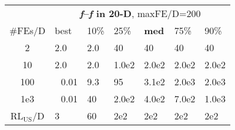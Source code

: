 \begin{tabular}{c|llllll}
 & \multicolumn{6}{|c}{\textbf{\textit{f}\raisebox{-0.35ex}{1}--\textit{f}\raisebox{-0.35ex}{24} in 20-D}, maxFE/D=200}\\
\#FEs/D & best & 10\% & 25\% & \textbf{med} & 75\% & 90\%\\
2 & \hspace*{1ex}2.0 & \hspace*{1ex}2.0 & 40 & 40 & 40 & 40\\
10 & \hspace*{1ex}2.0 & \hspace*{1ex}2.0 & 1.0e2 & 2.0e2 & 2.0e2 & 2.0e2\\
100 & ~\,0.01 & \hspace*{1ex}9.3 & 95 & 3.1e2 & 2.0e3 & 2.0e3\\
1e3 & ~\,0.01 & 40 & 2.0e2 & 4.0e2 & 7.0e2 & 1.0e3\\
$\text{RL}_{\text{US}}$/D & 3 & 60 & 2e2 & 2e2 & 2e2 & 2e2
\end{tabular}
